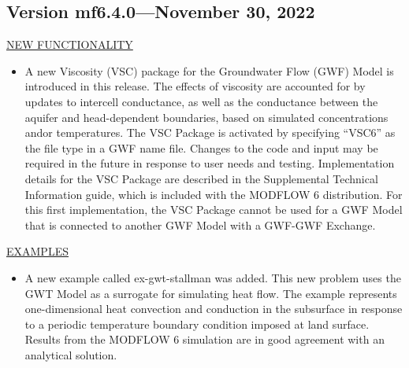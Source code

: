 	\subsection{Version mf6.4.0---November 30, 2022}
	
	\underline{NEW FUNCTIONALITY}
	\begin{itemize}
		\item A new Viscosity (VSC) package for the Groundwater Flow (GWF) Model is introduced in this release.  The effects of viscosity are accounted for by updates to intercell conductance, as well as the conductance between the aquifer and head-dependent boundaries, based on simulated concentrations and\/or temperatures.  The VSC Package is activated by specifying ``VSC6'' as the file type in a GWF name file.  Changes to the code and input may be required in the future in response to user needs and testing.  Implementation details for the VSC Package are described in the Supplemental Technical Information guide, which is included with the MODFLOW 6 distribution.  For this first implementation, the VSC Package cannot be used for a GWF Model that is connected to another GWF Model with a GWF-GWF Exchange.
	\end{itemize}

	\underline{EXAMPLES}
	\begin{itemize}
		\item A new example called ex-gwt-stallman was added.  This new problem uses the GWT Model as a surrogate for simulating heat flow.  The example represents one-dimensional heat convection and conduction in the subsurface in response to a periodic temperature boundary condition imposed at land surface.  Results from the MODFLOW 6 simulation are in good agreement with an analytical solution.
	\end{itemize}

